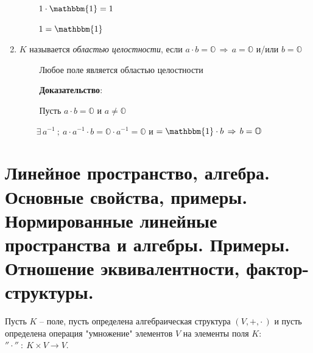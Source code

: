 \documentclass{article}
\begin{document}
\begin{enumerate}
    $\quad\quad\: 1\cdot\mathbbm{1}=1$
    
    $\quad\quad\: 1=\mathbbm{1}$
    \item $K$ называется \textit{областью целостности}, если $a\cdot b=\mathbb{O}\,\Rightarrow\,a=\mathbb{O}$ и/или $b=\mathbb{O}$
    
    $\quad\quad$ Любое поле является областью целостности
    
    $\quad\quad$ \textbf{Доказательство}:
    
    $\quad\quad$ Пусть $a\cdot b=\mathbb{O}$ и $a\neq\mathbb{O}$
    
    $\quad\quad\exists\,a^{-1}\:;\:a\cdot a^{-1}\cdot b=\mathbb{O}\cdot a^{-1}=\mathbb{O}$ и $=\mathbbm{1}\cdot b\,\Rightarrow\,b=\mathbb{O}$
    
\end{enumerate}

\newpage
\section{Линейное пространство, алгебра. Основные свойства, примеры. Нормированные линейные пространства и алгебры. Примеры. Отношение эквивалентности, фактор-структуры.}
Пусть $K$ -- поле, пусть определена алгебраическая структура $(V,+,\cdot\,)$ и пусть определена операция "умножение" элементов $V$ на элементы поля $K$: $''\cdot''\::\: K\times V\to V$.
\end{document}
